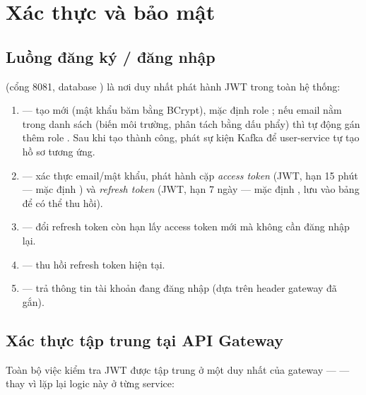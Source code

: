 \documentclass[12pt,a4paper]{report}
\begin{document}
\chapter{Xác thực và bảo mật}
\label{ch:security}

\section{Luồng đăng ký / đăng nhập}

 (cổng 8081, database ) là nơi duy nhất phát
hành JWT trong toàn hệ thống:

\begin{enumerate}[nosep]
    \item {} — tạo  mới (mật khẩu
    băm bằng BCrypt), mặc định role ; nếu email nằm trong danh sách
     (biến môi trường, phân tách bằng dấu phẩy) thì tự động
    gán thêm role . Sau khi tạo thành công, phát sự kiện Kafka
     để user-service tự tạo hồ sơ tương ứng.
    \item {} — xác thực email/mật khẩu, phát hành cặp
    \emph{access token} (JWT, hạn 15 phút — 
    mặc định ) và \emph{refresh token} (JWT, hạn 7 ngày —
     mặc định , lưu vào bảng
     để có thể thu hồi).
    \item {} — đổi refresh token còn hạn lấy access
    token mới mà không cần đăng nhập lại.
    \item {} — thu hồi refresh token hiện tại.
    \item {} — trả thông tin tài khoản đang đăng nhập
    (dựa trên header  gateway đã gắn).
\end{enumerate}

\section{Xác thực tập trung tại API Gateway}

Toàn bộ việc kiểm tra JWT được tập trung ở một  duy nhất
của gateway —  — thay vì lặp lại logic này ở
từng service:
\end{document}
